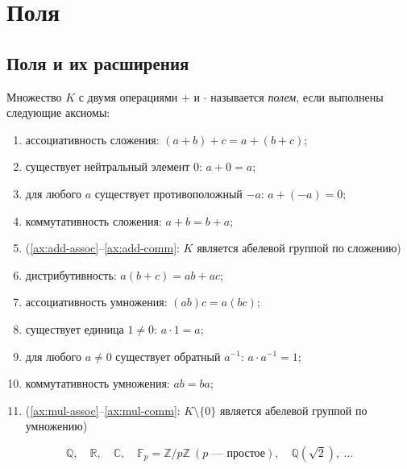 \documentclass[12pt]{article}
\begin{document}
    \section{Поля}
    
    \subsection{Поля и их расширения}
    
    \begin{definition}[Поле]\label{def:field}
    	Множество $K$ с двумя операциями $+$ и $\cdot$ называется \emph{полем}, если выполнены следующие аксиомы:
    	\begin{enumerate}
    		\item \label{ax:add-assoc} ассоциативность сложения: $(a+b)+c = a+(b+c)$;
    		\item \label{ax:zero} существует нейтральный элемент $0$: $a + 0 = a$;
    		\item \label{ax:add-inv} для любого $a$ существует противоположный $-a$: $a + (-a) = 0$;
    		\item \label{ax:add-comm} коммутативность сложения: $a + b = b + a$;
    		\smallskip
    		\item[] \quad (\ref{ax:add-assoc}--\ref{ax:add-comm}: $K$ является абелевой группой по сложению)
    		\smallskip
    		\item \label{ax:distrib} дистрибутивность: $a(b+c) = ab + ac$;
    		\smallskip
    		\item \label{ax:mul-assoc} ассоциативность умножения: $(ab)c = a(bc)$;
    		\item \label{ax:one} существует единица $1 \ne 0$: $a \cdot 1 = a$;
    		\item \label{ax:mul-inv} для любого $a \ne 0$ существует обратный $a^{-1}$: $a \cdot a^{-1} = 1$;
    		\item \label{ax:mul-comm} коммутативность умножения: $ab = ba$;
    		\smallskip
    		\item[] \quad (\ref{ax:mul-assoc}--\ref{ax:mul-comm}: $K \setminus \{0\}$ является абелевой группой по умножению)
    	\end{enumerate}
    \end{definition}
    
    \begin{example}
    	\[
    	\mathbb{Q}, \quad \mathbb{R}, \quad \mathbb{C}, \quad \mathbb{F}_p = \mathbb{Z}/p\mathbb{Z} \ (p \text{ --- простое}), \quad \mathbb{Q}(\sqrt{2}), \ \ldots
    	\]
    \end{example}
    
\end{document}
